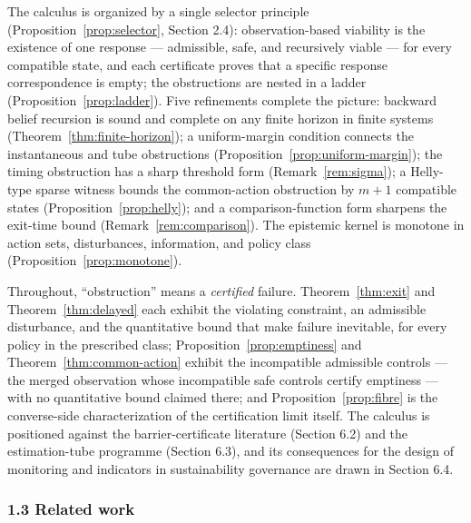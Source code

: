 \documentclass[10pt,twocolumn]{article}
\theoremstyle{definition}
\begin{document}
The calculus is organized by a single selector principle (Proposition~\ref{prop:selector}, Section 2.4):
observation-based viability is the existence of one response ---
admissible, safe, and recursively viable --- for every compatible state,
and each certificate proves that a specific response correspondence is
empty; the obstructions are nested in a ladder
(Proposition~\ref{prop:ladder}). Five refinements complete the picture:
backward belief recursion is sound and complete on any finite horizon
in finite systems (Theorem~\ref{thm:finite-horizon}); a uniform-margin
condition connects the instantaneous and tube obstructions
(Proposition~\ref{prop:uniform-margin}); the timing obstruction has a
sharp threshold form (Remark~\ref{rem:sigma}); a Helly-type sparse
witness bounds the common-action obstruction by \(m+1\) compatible
states (Proposition~\ref{prop:helly}); and a comparison-function form
sharpens the exit-time bound (Remark~\ref{rem:comparison}). The epistemic kernel is monotone in
action sets, disturbances, information, and policy class
(Proposition~\ref{prop:monotone}).

Throughout, ``obstruction'' means a \emph{certified} failure. Theorem~\ref{thm:exit} and Theorem~\ref{thm:delayed} each exhibit the violating constraint, an admissible disturbance,
and the quantitative bound that make failure inevitable, for every policy in the prescribed class; Proposition~\ref{prop:emptiness} and Theorem~\ref{thm:common-action} exhibit the incompatible
admissible controls --- the merged observation whose incompatible safe
controls certify emptiness --- with no quantitative bound claimed there;
and Proposition~\ref{prop:fibre} is the converse-side characterization of the certification
limit itself. The calculus is positioned against
the barrier-certificate literature (Section 6.2) and the estimation-tube
programme (Section 6.3), and its consequences for the design of
monitoring and indicators in sustainability governance are drawn in
Section 6.4.

\subsubsection{1.3 Related work}\label{related-work}
\end{document}
